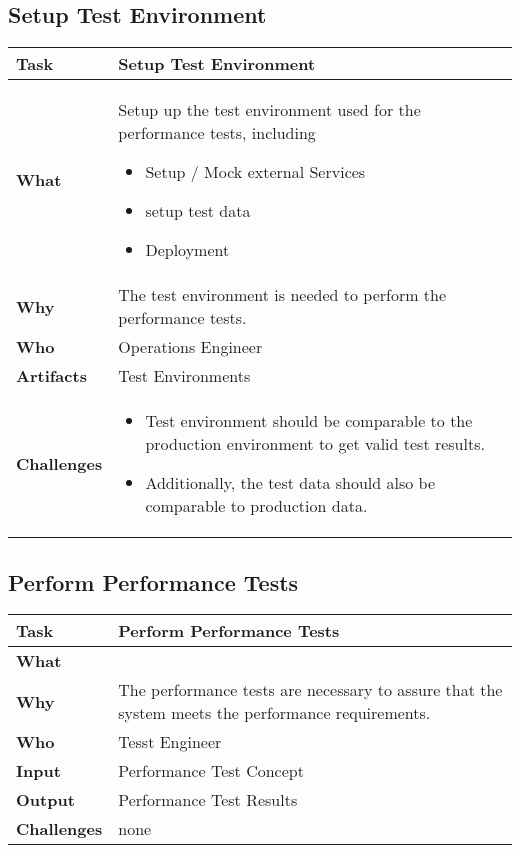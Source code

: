 \subsection{Setup Test Environment}
\begin{minipage}{\textwidth}
 \label{table:ch6_Task_Setup_Test_Environment}
\begin{tabular}
	{|m{3cm}|m{10cm}|} \hline \bfseries Task & Setup Test Environment\\
	\hline \bfseries What & Setup up the test environment used for the performance tests, including
	\begin{itemize}
		\item Setup / Mock external Services
		\item setup test data
		\item Deployment
	\end{itemize}
	\\
	\hline \bfseries Why & The test environment is needed to perform the performance tests.\\
	\hline \bfseries Who & Operations Engineer\\
	\hline \bfseries Artifacts & Test Environments\\
	\hline \bfseries Challenges & 
	\begin{itemize}
		\item Test environment should be comparable to the production environment to get valid test results.
		\item Additionally, the test data should also be comparable to production data.
	\end{itemize}
	\\
	\hline
\end{tabular}
\end{minipage}

\subsection{Perform Performance Tests}
\begin{minipage}{\textwidth}
 \label{table:ch6_Task_Perform_Performance_Tests}
\begin{tabular}
	{|m{3cm}|m{10cm}|} \hline \bfseries Task & Perform Performance Tests\\
	\hline \bfseries What & \\
	\hline \bfseries Why & The performance tests are necessary to assure that the system meets the performance requirements.\\
	\hline \bfseries Who & Tesst Engineer\\
	\hline \bfseries Input & Performance Test Concept\\
	\hline \bfseries Output & Performance Test Results\\
	\hline \bfseries Challenges & none\\
	\hline 
\end{tabular}
\end{minipage}

